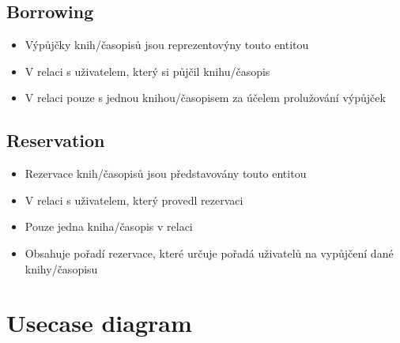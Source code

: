 \documentclass{article}
\begin{document}
\subsection*{Borrowing}
\begin{itemize}
    \item Výpůjčky knih/časopisů jsou reprezentovýny touto entitou
    \item V relaci s uživatelem, který si půjčil knihu/časopis
    \item V relaci pouze s jednou knihou/časopisem za účelem prolužování
    výpůjček
\end{itemize}

\subsection*{Reservation}
\begin{itemize}
    \item Rezervace knih/časopisů jsou představovány touto entitou
    \item V relaci s uživatelem, který provedl rezervaci
    \item Pouze jedna kniha/časopis v relaci
    \item Obsahuje pořadí rezervace, které určuje pořadá uživatelů na vypůjčení
    dané knihy/časopisu
\end{itemize}

\newpage

\section*{Usecase diagram}
\end{document}
